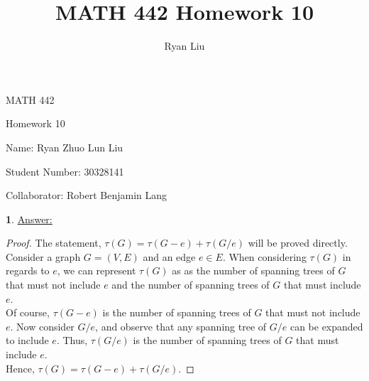 \documentclass[12pt,a4paper]{article}
\author{Ryan Liu}
\title{MATH 442 Homework 10}
\theoremstyle{definition}
\newtheorem{problem}{}
\begin{document}
\begin{center}
{\huge MATH 442 \par}
{\Large Homework  10  \par}
{\normalsize Name: Ryan Zhuo Lun Liu \par}
{\normalsize Student Number: 30328141 \par}
{\normalsize Collaborator: Robert Benjamin Lang \par}
\end{center}

\begin{problem} \underline{Answer:}
\begin{proof} The statement, $\tau(G) = \tau(G - e) + \tau(G/e)$ will be proved directly. \\

Consider a graph $G = (V, E)$ and an edge $e \in E$. When considering $\tau(G)$ in regards to $e$, we can represent $\tau(G)$ as as the number of spanning trees of $G$ that must not include $e$ and the number of spanning trees of $G$ that must include $e$. \\

Of course, $\tau(G - e)$ is the number of spanning trees of $G$ that must not include $e$. Now consider $G/e$, and observe that any spanning tree of $G/e$ can be expanded to include $e$. Thus, $\tau(G/e)$ is the number of spanning trees of $G$ that must include $e$. \\

Hence, $\tau(G) = \tau(G - e) + \tau(G/e)$.
\end{proof}
\end{problem}
\end{document}
